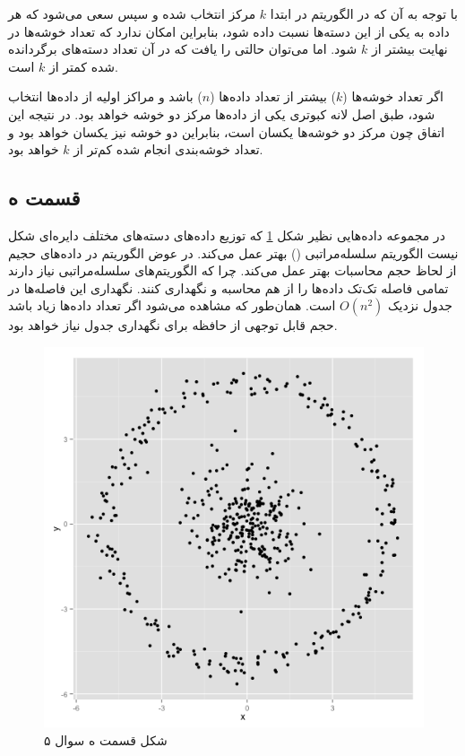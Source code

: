 \documentclass[12pt, a4paper]{article}
\begin{document}
با توجه به آن که در الگوریتم  در ابتدا $k$ مرکز انتخاب شده و
سپس سعی می‌شود که هر داده به یکی از این دسته‌ها نسبت داده شود، بنابراین امکان ندارد
که تعداد خوشه‌ها در نهایت بیشتر از $k$ شود. اما می‌توان حالتی را یافت که در
آن تعداد دسته‌های برگردانده شده کمتر از $k$ است.

اگر تعداد خوشه‌ها ($k$) بیشتر از تعداد داده‌ها ($n$) باشد و
مراکز اولیه از داده‌ها انتخاب شود، طبق اصل لانه کبوتری یکی از داده‌ها
مرکز دو خوشه خواهد بود. در نتیجه این اتفاق چون مرکز دو خوشه‌ها یکسان است،
بنابراین دو خوشه نیز یکسان خواهد بود و تعداد خوشه‌بندی انجام شده
کم‌تر از $k$ خواهد بود.

\subsection*{قسمت ه}

در مجموعه داده‌هایی نظیر شکل \ref{q5e} که توزیع داده‌های دسته‌های مختلف
دایره‌ای شکل نیست الگوریتم سلسله‌مراتبی () بهتر عمل می‌کند.
در عوض الگوریتم  در داده‌های حجیم از لحاظ حجم محاسبات بهتر عمل می‌کند.
چرا که الگوریتم‌های سلسله‌مراتبی نیاز دارند تمامی فاصله تک‌تک داده‌ها را از هم
محاسبه و نگهداری کنند. نگهداری این فاصله‌ها در جدول نزدیک $O(n^2)$ است. همان‌طور
که مشاهده می‌شود اگر تعداد داده‌ها زیاد باشد حجم قابل توجهی از حافظه برای نگهداری
جدول نیاز خواهد بود.

\begin{figure}[h]
    \centering
    \includegraphics[width=0.3\linewidth]{images/q5/d/distribution.png}
    \caption{شکل قسمت ه سوال ۵}
    \label{q5e}
\end{figure}
\end{document}
